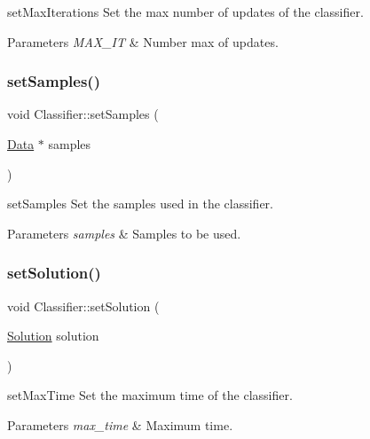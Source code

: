 set\+Max\+Iterations Set the max number of updates of the classifier. 


\begin{DoxyParams}{Parameters}
{\em M\+A\+X\+\_\+\+IT} & Number max of updates. \\
\hline
\end{DoxyParams}
\mbox{\label{class_classifier_a4b16736670cba8f4c8397b6a90c8c799}} 
\subsubsection{\texorpdfstring{set\+Samples()}{setSamples()}}
{\footnotesize\ttfamily void Classifier\+::set\+Samples (\begin{DoxyParamCaption}\item[{\hyperlink{class_data}{Data} $\ast$}]{samples }\end{DoxyParamCaption})\hspace{0.3cm}{\ttfamily [virtual]}}



set\+Samples Set the samples used in the classifier. 


\begin{DoxyParams}{Parameters}
{\em samples} & Samples to be used. \\
\hline
\end{DoxyParams}
\mbox{\label{class_classifier_aef6cb633eed60712f8948a404f630e82}} 
\subsubsection{\texorpdfstring{set\+Solution()}{setSolution()}}
{\footnotesize\ttfamily void Classifier\+::set\+Solution (\begin{DoxyParamCaption}\item[{\hyperlink{class_solution}{Solution}}]{solution }\end{DoxyParamCaption})}



set\+Max\+Time Set the maximum time of the classifier. 


\begin{DoxyParams}{Parameters}
{\em max\+\_\+time} & Maximum time. \\
\hline
\end{DoxyParams}
\mbox{\label{class_classifier_a7f1cf3ac53b0593307a050368a912bb4}} 
